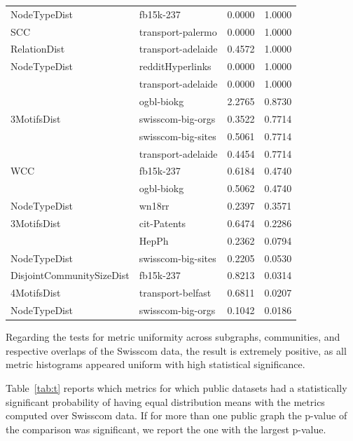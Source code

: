\begin{table}[hb!]
\begin{adjustbox}{width=0.75\columnwidth}
\begin{tabular}{llrr}
NodeTypeDist & fb15k-237 &       0.0000 &        1.0000 \\
SCC & transport-palermo &       0.0000 &        1.0000 \\
RelationDist & transport-adelaide &       0.4572 &        1.0000 \\
NodeTypeDist & redditHyperlinks &       0.0000 &        1.0000 \\
             & transport-adelaide &       0.0000 &        1.0000 \\
             & ogbl-biokg &       2.2765 &        0.8730 \\
3MotifsDist & swisscom-big-orgs &       0.3522 &        0.7714 \\
             & swisscom-big-sites &       0.5061 &        0.7714 \\
             & transport-adelaide &       0.4454 &        0.7714 \\
WCC & fb15k-237 &       0.6184 &        0.4740 \\
             & ogbl-biokg &       0.5062 &        0.4740 \\
NodeTypeDist & wn18rr &       0.2397 &        0.3571 \\
3MotifsDist & cit-Patents &       0.6474 &        0.2286 \\
             & HepPh &       0.2362 &        0.0794 \\
NodeTypeDist & swisscom-big-sites &       0.2205 &        0.0530 \\
DisjointCommunitySizeDist & fb15k-237 &       0.8213 &        0.0314 \\
4MotifsDist & transport-belfast &       0.6811 &        0.0207 \\
NodeTypeDist & swisscom-big-orgs &       0.1042 &        0.0186 \\
\bottomrule
\end{tabular}
\end{adjustbox}
\end{table}

Regarding the tests for metric uniformity across subgraphs, communities, and respective overlaps of the Swisscom data, the result is extremely positive, as all metric histograms appeared uniform with high statistical significance. 

Table~\ref{tab:t} reports which metrics for which public datasets had a statistically significant probability of having equal distribution means with the metrics computed over Swisscom data. If for more than one public graph the p-value of the comparison was significant, we report the one with the largest p-value. 

